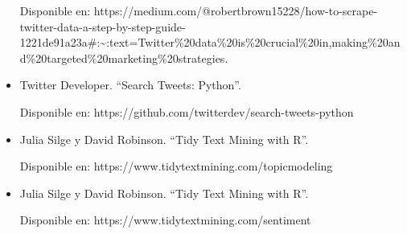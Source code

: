 \documentclass[
  letterpaper,
  DIV=11,
  numbers=noendperiod]{scrartcl}
\begin{document}
\begin{itemize}
  Disponible en:
  https://medium.com/@robertbrown15228/how-to-scrape-twitter-data-a-step-by-step-guide-1221de91a23a\#:\textasciitilde:text=Twitter\%20data\%20is\%20crucial\%20in,making\%20and\%20targeted\%20marketing\%20strategies.
\item
  Twitter Developer. ``Search Tweets: Python''.

  Disponible en: https://github.com/twitterdev/search-tweets-python
\item
  Julia Silge y David Robinson. ``Tidy Text Mining with R''.

  Disponible en: https://www.tidytextmining.com/topicmodeling
\item
  Julia Silge y David Robinson. ``Tidy Text Mining with R''.

  Disponible en: https://www.tidytextmining.com/sentiment
\end{itemize}
\end{document}
